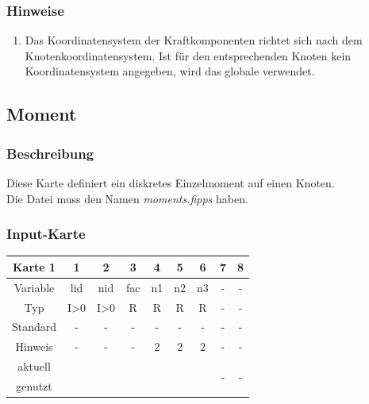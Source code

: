 \documentclass[11pt,titlepage,listof=totoc,bibliography=totoc,twoside]{scrreprt}
\begin{document}
{{\subsubsection{Hinweise}

\begin{enumerate}
\item Das Koordinatensystem der Kraftkomponenten richtet sich nach dem Knotenkoordinatensystem. Ist für den entsprechenden Knoten kein Koordinatensystem angegeben, wird das globale verwendet.
\end{enumerate}

\newpage

\subsection{Moment}

\subsubsection{Beschreibung}

Diese Karte definiert ein diskretes Einzelmoment auf einen Knoten.\\
Die Datei muss den Namen \emph{moments.fipps} haben.

\subsubsection{Input-Karte}

\begin{table}[htbp]
\centering
\begin{tabularx}{\textwidth}{cCCCCCCCC}
\toprule
Karte 1	& 1		& 2		& 3		& 4		& 5		& 6		& 7	& 8	\\
\midrule
Variable& lid		& nid		& fac		& n1		& n2		& n3		& -	& -	\\
Typ	& I>0		& I>0		& R		& R		& R		& R		& -	& -	\\
Standard& -		& -		& -		& -		& -		& -		& -	& -	\\
Hinweis	& -		& -		& -		& 2		& 2		& 2		& -	& -	\\
aktuell	& 	& 	& 	& 	& 	& 	& \multirow{2}{*}{-}	& 	\\
genutzt \\
\bottomrule
\end{tabularx}
\end{table}

}}
\end{document}
